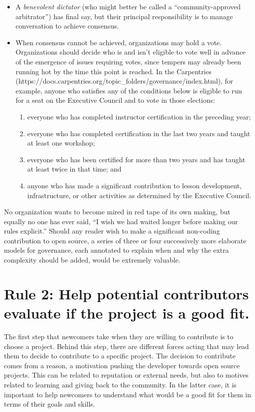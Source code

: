 \documentclass[10pt,letterpaper]{article}
\newcommand{\rulemajor}[1]{\section{#1}}
\begin{document}
\begin{itemize}

\item
  A \emph{benevolent dictator} (who might better be called a ``community-approved arbitrator'') has final say,
  but their principal responsibility is to manage conversation to achieve consensus.

\item
  When consensus cannot be achieved,
  organizations may hold a vote.
  Organizations should decide who is and isn't eligible to vote well in advance of the emergence of issues requiring votes,
  since tempers may already been running hot by the time this point is reached.
  In the Carpentries (https://docs.carpentries.org/topic\_folders/governance/index.html),
  for example,
  anyone who satisfies any of the conditions below is eligible to run for a seat on the Executive Council and to vote in those elections:
  \begin{enumerate}
    \item everyone who has completed instructor certification in the preceding year;
    \item everyone who has completed certification in the last two years and taught at least one workshop;
    \item everyone who has been certified for more than two years and has taught at least twice in that time; and
    \item anyone who has made a significant contribution to lesson development, infrastructure, or other activities as determined by the Executive Council.
  \end{enumerate}

\end{itemize}

No organization wants to become mired in red tape of its own making,
but equally no one has ever said,
``I wish we had waited longer before making our rules explicit.''
Should any reader wish to make a significant non-coding contribution to open source,
a series of three or four successively more elaborate models for governance,
each annotated to explain when and why the extra complexity should be added, would be extremely valuable.

\rulemajor{Rule 2: Help potential contributors evaluate if the project is a good fit.}

The first step that newcomers take when they are willing to contribute is to choose a project.
Behind this step,
there are different forces acting that may lead them to decide to contribute to a specific project.
The decision to contribute comes from a reason,
a motivation pushing the developer towards open source projects.
This can be related to reputation or external needs,
but also to motives related to learning and giving back to the community.
In the latter case,
it is important to help newcomers to understand what would be a good fit for them in terms of their goals and skills.
\end{document}
